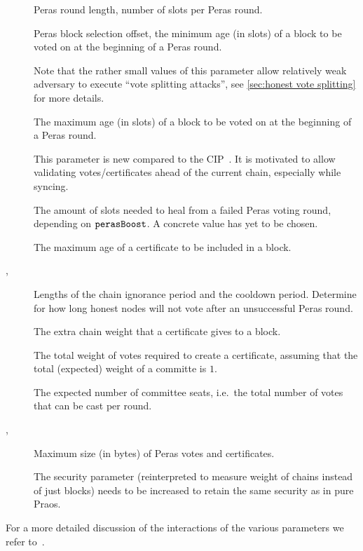 \begin{description}
\item[\perasRoundSlots]
  Peras round length, number of slots per Peras round.
\item[\perasBlockMinSlots]
  Peras block selection offset, the minimum age (in slots) of a block to be voted on at the beginning of a Peras round.

  Note that the rather small values of this parameter allow relatively weak adversary to execute \enquote{vote splitting attacks}, see \cref{sec:honest vote splitting} for more details.
\item[\perasBlockMaxSlots]
  The maximum age (in slots) of a block to be voted on at the beginning of a Peras round.

  This parameter is new compared to the CIP~\cite{peras-cip}.
  It is motivated to allow validating votes/certificates ahead of the current chain, especially while syncing.
\item[\perasHealingSlots]
  The amount of slots needed to heal from a failed Peras voting round, depending on $\mathtt{perasBoost}$.
  A concrete value has yet to be chosen.
\item[\perasCertMaxSlots]
  The maximum age of a certificate to be included in a block.
\item[\perasIgnoranceRounds, \perasCooldownRounds]
  Lengths of the chain ignorance period and the cooldown period.
  Determine for how long honest nodes will not vote after an unsuccessful Peras round.
\item[\perasBoost]
  The extra chain weight that a certificate gives to a block.
\item[\perasQuorum]
  The total weight of votes required to create a certificate, assuming that the total (expected) weight of a committe is $1$.
\item[\perasN]
  The expected number of committee seats, i.e.\ the total number of votes that can be cast per round.
\item[\perasVoteSizeLimit, \perasCertSizeLimit]
  Maximum size (in bytes) of Peras votes and certificates.
\item[\kcp]
  The security parameter (reinterpreted to measure weight of chains instead of just blocks) needs to be increased to retain the same security as in pure Praos.
\end{description}

For a more detailed discussion of the interactions of the various parameters we refer to~\cite{peras-cip}.

